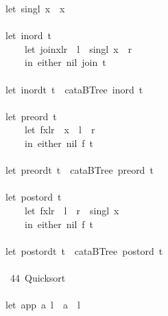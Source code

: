 \documentclass[a4paper]{article}
\begin{document}
\begin{tabbing}
\ttfamily ~let~singl~x~~x\\
\ttfamily ~\\
\ttfamily ~let~inord~t~\\
\ttfamily ~~~~~let~joinxlr~~l~~singl~x~~r\\
\ttfamily ~~~~~in~either~nil~join~t\\
\ttfamily ~\\
\ttfamily ~let~inordt~t~~cataBTree~inord~t\\
\ttfamily ~\\
\ttfamily ~let~preord~t~\\
\ttfamily ~~~~~let~fxlr~~x~~l~~r\\
\ttfamily ~~~~~in~either~nil~f~t\\
\ttfamily ~\\
\ttfamily ~let~preordt~t~~cataBTree~preord~t\\
\ttfamily ~\\
\ttfamily ~let~postord~t~\\
\ttfamily ~~~~~let~fxlr~~l~~r~~singl~x\\
\ttfamily ~~~~~in~either~nil~f~t\\
\ttfamily ~\\
\ttfamily ~let~postordt~t~~cataBTree~postord~t\\
\ttfamily ~\\
\ttfamily ~~44~Quicksort~\\
\ttfamily ~\\
\ttfamily ~let~app~a~l~~a~~l\\

\end{tabbing}
\end{document}
